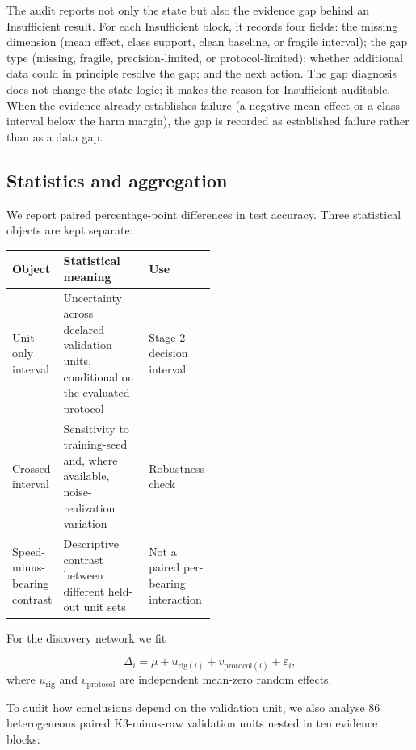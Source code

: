 \documentclass[11pt]{article}
\begin{document}
The audit reports not only the state but also the evidence gap behind an
Insufficient result. For each Insufficient block, it records four fields: the
missing dimension (mean effect, class support, clean baseline, or fragile
interval); the gap type (missing, fragile, precision-limited, or
protocol-limited); whether additional data could in principle resolve the gap;
and the next action. The gap diagnosis does not change the state logic; it makes
the reason for Insufficient auditable. When the evidence already establishes
failure (a negative mean effect or a class interval below the harm margin), the
gap is recorded as established failure rather than as a data gap.

\subsection{Statistics and aggregation}

We report paired percentage-point differences in test accuracy. Three
statistical objects are kept separate:

\begin{center}
\small
\begin{tabularx}{\linewidth}{@{}>{\raggedright\arraybackslash}p{0.23\linewidth}>{\raggedright\arraybackslash}X>{\raggedright\arraybackslash}p{0.27\linewidth}@{}}
\toprule
Object & Statistical meaning & Use \\
\midrule
Unit-only interval & Uncertainty across declared validation units, conditional
on the evaluated protocol & Stage 2 decision interval \\
Crossed interval & Sensitivity to training-seed and, where available,
noise-realization variation & Robustness check \\
Speed-minus-bearing contrast & Descriptive contrast between different held-out
unit sets & Not a paired per-bearing interaction \\
\bottomrule
\end{tabularx}
\end{center}

For the discovery network we fit

\begin{equation}
\Delta_i=\mu+u_{\mathrm{rig}(i)}+v_{\mathrm{protocol}(i)}
+\varepsilon_i,
\label{eq:hierarchical}
\end{equation}
where $u_{\mathrm{rig}}$ and $v_{\mathrm{protocol}}$ are independent mean-zero
random effects.

To audit how conclusions depend on the validation unit, we also analyse 86
heterogeneous paired K3-minus-raw validation units nested in ten evidence
blocks:
\end{document}
